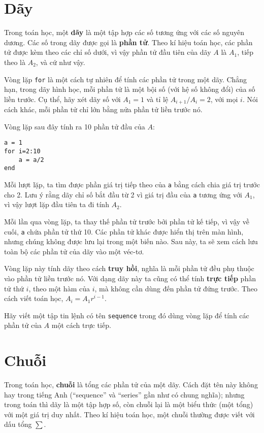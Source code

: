 \documentclass[12pt]{book}
\begin{document}
\section{Dãy}

Trong toán học, một {\bf dãy} là một tập hợp các số tương ứng với
các số nguyên dương. Các số trong dãy được gọi là 
{\bf phần tử}. Theo kí hiệu toán học, các phần tử được kèm theo 
các chỉ số dưới, vì vậy phần tử đầu tiên của dãy $A$ là $A_1$,
tiếp theo là $A_2$, và cứ như vậy.

Vòng lặp {\tt for} là một cách tự nhiên để tính các phần tử trong một
dãy. Chẳng hạn, trong dãy hình học, mỗi phần tử là một bội số (với
hệ số không đổi) của số liền trước. Cụ thể, hãy xét dãy số với 
$A_1 = 1$ và tỉ lệ $A_{i+1} / A_i = 2$, với mọi $i$. Nói cách khác,
mỗi phần tử chỉ lớn bằng nửa phần tử liền trước nó.

Vòng lặp sau đây tính ra 10 phần tử đầu của $A$:

\begin{verbatim}
a = 1
for i=2:10
    a = a/2
end
\end{verbatim}
%
Mỗi lượt lặp, ta tìm được phần giá trị tiếp theo của {\tt a}
bằng cách chia giá trị trước cho 2. Lưu ý rằng dãy chỉ số bắt
đầu từ 2 vì giá trị đầu của {\tt a} tương ứng với $A_1$, vì vậy
lượt lặp đầu tiên ta đi tính $A_2$.

Mỗi lần qua vòng lặp, ta thay thế phần tử trước bởi phần tử
kế tiếp, vì vậy về cuối, {\tt a} chứa phần tử thứ 10. Các phần tử
khác được hiển thị trên màn hình, nhưng chúng không được lưu
lại trong một biến nào. Sau này, ta sẽ xem cách lưu toàn bộ các
phần tử của dãy vào một véc-tơ.

Vòng lặp này tính dãy theo cách {\bf truy hồi}, nghĩa là mỗi phần tử
đều phụ thuộc vào phần tử liền trước nó. Với dạng dãy này ta cũng
có thể tính {\bf trực tiếp} phần tử thứ $i$, theo một hàm của $i$,
mà không cần dùng đến phần tử đứng trước. Theo cách viết
toán học, $A_i = A_1 r^{i-1}$.  

\begin{ex}
Hãy viết một tập tin lệnh có tên {\tt sequence} trong đó dùng vòng lặp
để tính các phần tử của $A$ một cách trực tiếp.
\end{ex}


\section{Chuỗi}
\label{chuỗi}

Trong toán học, {\bf chuỗi} là tổng các phần tử của một dãy. 
Cách đặt tên này không hay trong tiếng Anh (``sequence'' và 
``series'' gần như có chung nghĩa); nhưng trong toán thì
dãy là một tập hợp số, còn chuỗi lại là một biểu thức (một
tổng) với một giá trị duy nhất. Theo kí hiệu toán học, một
chuỗi thường được viết với dấu tổng $\sum$.
\end{document}
